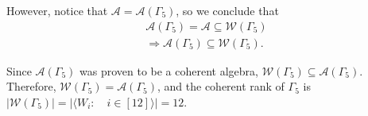 However, notice that $\mathcal{A}=\mathcal{A}(\Gamma_5)$, so we conclude that
\begin{align*}
    \mathcal{A}(\Gamma_5)=\mathcal{A}\subseteq\mathcal{W}(\Gamma_5)\\
    \Rightarrow\mathcal{A}(\Gamma_5)\subseteq\mathcal{W}(\Gamma_5).
\end{align*}

Since $\mathcal{A}(\Gamma_5)$ was proven to be a coherent algebra, $\mathcal{W}(\Gamma_5)\subseteq\mathcal{A}(\Gamma_5)$.
Therefore, $\mathcal{W}(\Gamma_5)=\mathcal{A}(\Gamma_5)$, and the coherent rank of $\Gamma_5$ is $|\mathcal{W}(\Gamma_5)| = |\langle W_i:\quad i\in[12]\rangle|=12$.





